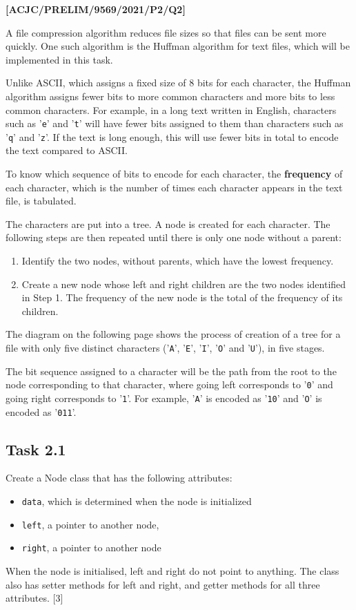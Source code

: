 \item \textbf{{[}ACJC/PRELIM/9569/2021/P2/Q2{]} }

\noindent A file compression algorithm reduces file sizes so that
files can be sent more quickly. One such algorithm is the Huffman
algorithm for text files, which will be implemented in this task.

\noindent Unlike ASCII, which assigns a fixed size of 8 bits for each
character, the Huffman algorithm assigns fewer bits to more common
characters and more bits to less common characters. For example, in
a long text written in English, characters such as '\texttt{e}' and
'\texttt{t}' will have fewer bits assigned to them than characters
such as '\texttt{q}' and '\texttt{z}'. If the text is long enough,
this will use fewer bits in total to encode the text compared to ASCII.

\noindent To know which sequence of bits to encode for each character,
the \textbf{frequency} of each character, which is the number of times
each character appears in the text file, is tabulated.

\noindent The characters are put into a tree. A node is created for
each character. The following steps are then repeated until there
is only one node without a parent:
\begin{enumerate}
\item Identify the two nodes, without parents, which have the lowest frequency. 
\item Create a new node whose left and right children are the two nodes
identified in Step 1. The frequency of the new node is the total of
the frequency of its children.
\end{enumerate}
\noindent The diagram on the following page shows the process of creation
of a tree for a file with only five distinct characters ('\texttt{A}',
'\texttt{E}', '\texttt{I}', '\texttt{O}' and '\texttt{U}'), in five
stages.

\noindent The bit sequence assigned to a character will be the path
from the root to the node corresponding to that character, where going
left corresponds to '\texttt{0}' and going right corresponds to '\texttt{1}'.
For example, '\texttt{A}' is encoded as '\texttt{10}' and '\texttt{O}'
is encoded as '\texttt{011}'.

\subsection*{Task 2.1}

\noindent Create a Node class that has the following attributes: 
\begin{itemize}
\item \texttt{data}, which is determined when the node is initialized 
\item \texttt{left}, a pointer to another node, 
\item \texttt{right}, a pointer to another node 
\end{itemize}
\noindent When the node is initialised, left and right do not point
to anything. The class also has setter methods for left and right,
and getter methods for all three attributes. \hfill{}{[}3{]}

